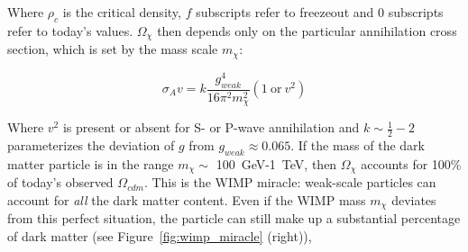 Where $\rho_{c}$ is the critical density, $f$ subscripts refer to freezeout and $0$ subscripts refer to today's values. $\Omega_{\chi}$ then depends only on the particular annihilation cross section, which is set by the mass scale $m_{\chi}$:

\begin{equation}
\label{eq:sigmav}
\sigma_{A}v = k \frac{g_{weak}^{4}}{16 \pi^{2}m_{\chi}^{2}} ( \mathrm{1~or}~v^{2} ) 
\end{equation}

Where $v^{2}$ is present or absent for S- or P-wave annihilation and $k \sim \frac{1}{2} - 2$ parameterizes the deviation of $g$ from $g_{weak} \approx 0.065$. If the mass of the dark matter particle is in the range $m_{\chi} \sim$ 100~GeV-1~TeV, then $\Omega_{\chi}$ accounts for 100\% of today's observed $\Omega_{cdm}$. This is the \ac{WIMP} miracle: weak-scale particles can account for \textit{all} the dark matter content. Even if the \ac{WIMP} mass $m_{\chi}$ deviates from this perfect situation, the particle can still make up a substantial percentage of dark matter (see Figure~\ref{fig:wimp_miracle} (right)),

